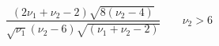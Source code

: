 

\[
\frac {(2\nu_{1} + \nu_{2} - 2)\sqrt{8(\nu_{2} - 4)}} {\sqrt{\nu_{1}}(\nu_{2} - 6)\sqrt{(\nu_{1} + \nu_{2} - 2)}} \;\;\;\;\;\;\; \nu_{2} > 6
\]



